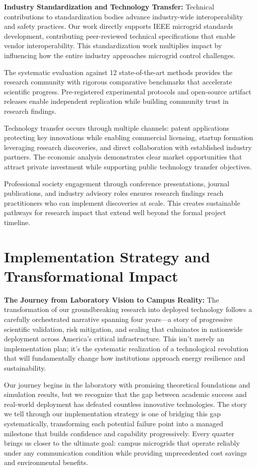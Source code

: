 \documentclass[12pt]{article}
\begin{document}
\textbf{Industry Standardization and Technology Transfer:} Technical contributions to standardization bodies advance industry-wide interoperability and safety practices. Our work directly supports IEEE microgrid standards development, contributing peer-reviewed technical specifications that enable vendor interoperability. This standardization work multiplies impact by influencing how the entire industry approaches microgrid control challenges.

The systematic evaluation against 12 state-of-the-art methods \cite{our2024comparative} provides the research community with rigorous comparative benchmarks that accelerate scientific progress. Pre-registered experimental protocols and open-source artifact releases enable independent replication while building community trust in research findings.

Technology transfer occurs through multiple channels: patent applications protecting key innovations while enabling commercial licensing, startup formation leveraging research discoveries, and direct collaboration with established industry partners. The economic analysis demonstrates clear market opportunities that attract private investment while supporting public technology transfer objectives.

Professional society engagement through conference presentations, journal publications, and industry advisory roles ensures research findings reach practitioners who can implement discoveries at scale. This creates sustainable pathways for research impact that extend well beyond the formal project timeline.

\section{Implementation Strategy and Transformational Impact}

\textbf{The Journey from Laboratory Vision to Campus Reality:} The transformation of our groundbreaking research into deployed technology follows a carefully orchestrated narrative spanning four years—a story of progressive scientific validation, risk mitigation, and scaling that culminates in nationwide deployment across America's critical infrastructure. This isn't merely an implementation plan; it's the systematic realization of a technological revolution that will fundamentally change how institutions approach energy resilience and sustainability.

Our journey begins in the laboratory with promising theoretical foundations and simulation results, but we recognize that the gap between academic success and real-world deployment has defeated countless innovative technologies. The story we tell through our implementation strategy is one of bridging this gap systematically, transforming each potential failure point into a managed milestone that builds confidence and capability progressively. Every quarter brings us closer to the ultimate goal: campus microgrids that operate reliably under any communication condition while providing unprecedented cost savings and environmental benefits.
\end{document}
